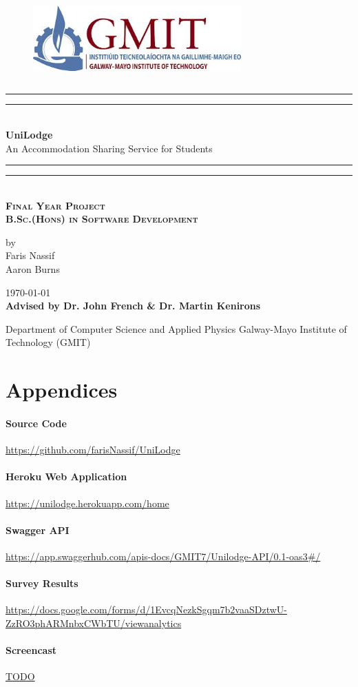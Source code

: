 \documentclass[10pt]{report}
\newcommand*{\customTitle}{\begingroup %
\centering %
\vspace*{\baselineskip} %

\rule{\textwidth}{1.6pt}\vspace*{-\baselineskip}\vspace*{2pt} %
\rule{\textwidth}{0.4pt}\\[\baselineskip] %

{\Large \textbf{UniLodge}  \\[2ex] An Accommodation Sharing Service for Students}\\[0.2\baselineskip] %


\rule{\textwidth}{0.4pt}\vspace*{-\baselineskip}\vspace{3.2pt} %
\rule{\textwidth}{1.6pt}\\[\baselineskip] %
\scshape %
\Large \textbf{Final Year Project}\\
\textbf{B.Sc.(Hons) in Software Development}\par %
\normalsize
\vspace*{2\baselineskip} %


{by \\ Faris Nassif \\ Aaron Burns \par} %


\vspace*{2\baselineskip} %
\vfill %
{\scshape \today} \\[0.3\baselineskip] %


{\textbf{Advised by Dr. John French \& Dr. Martin Kenirons}}\par %

{Department of Computer Science and Applied Physics Galway-Mayo Institute of Technology (GMIT)}\par %


\endgroup}
\begin{document}
 
\begin{figure}
\begin{center}
\includegraphics[width=8cm,height=3.3cm,keepaspectratio]{images/gmit-logo.jpg} %
\end{center}
\end{figure}
\customTitle %
\tableofcontents
\listoffigures
{} 














\appendix
\chapter*{Appendices}
\renewcommand{\thesection}{A.\arabic{section}}

\subsubsection{Source Code}
\url{https://github.com/farisNassif/UniLodge}

\subsubsection{Heroku Web Application}
\url{https://unilodge.herokuapp.com/home}

\subsubsection{Swagger API}
\url{https://app.swaggerhub.com/apis-docs/GMIT7/Unilodge-API/0.1-oas3#/}

\subsubsection{Survey Results}
\url{https://docs.google.com/forms/d/1EvcqNezkSgqm7b2vaaSDztwU-ZzRO3phARMnbxCWbTU/viewanalytics}

\subsubsection{Screencast}
\url{TODO}
\end{document}

